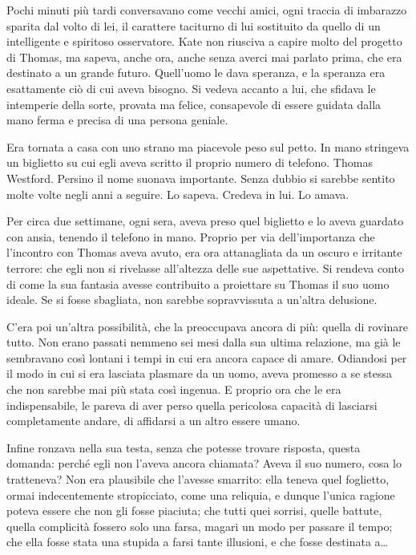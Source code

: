Pochi minuti più tardi conversavano come vecchi amici, ogni traccia di imbarazzo sparita dal volto
di lei, il carattere taciturno di lui sostituito da quello di un intelligente e spiritoso
osservatore. Kate non riusciva a capire molto del progetto di Thomas, ma sapeva, anche ora, anche
senza averci mai parlato prima, che era destinato a un grande futuro. Quell'uomo le dava speranza, e
la speranza era esattamente ciò di cui aveva bisogno. Si vedeva accanto a lui, che sfidava le
intemperie della sorte, provata ma felice, consapevole di essere guidata dalla mano ferma e precisa
di una persona geniale.

Era tornata a casa con uno strano ma piacevole peso sul petto. In mano stringeva un biglietto su cui
egli aveva scritto il proprio numero di telefono. Thomas Westford. Persino il nome suonava
importante. Senza dubbio si sarebbe sentito molte volte negli anni a seguire. Lo sapeva. Credeva in
lui. Lo amava.

Per circa due settimane, ogni sera, aveva preso quel biglietto e lo aveva guardato con ansia,
tenendo il telefono in mano. Proprio per via dell'importanza che l'incontro con Thomas aveva avuto,
era ora attanagliata da un oscuro e irritante terrore: che egli non si rivelasse all'altezza delle
sue aspettative. Si rendeva conto di come la sua fantasia avesse contribuito a proiettare su Thomas
il suo uomo ideale. Se si fosse sbagliata, non sarebbe sopravvissuta a un'altra delusione.

C'era poi un'altra possibilità, che la preoccupava ancora di più: quella di rovinare tutto. Non
erano passati nemmeno sei mesi dalla sua ultima relazione, ma già le sembravano così lontani i tempi
in cui era ancora capace di amare. Odiandosi per il modo in cui si era lasciata plasmare da un uomo,
aveva promesso a se stessa che non sarebbe mai più stata così ingenua. E proprio ora che le era
indispensabile, le pareva di aver perso quella pericolosa capacità di lasciarsi completamente
andare, di affidarsi a un altro essere umano.

Infine ronzava nella sua testa, senza che potesse trovare risposta, questa domanda: perché egli non
l'aveva ancora chiamata? Aveva il suo numero, cosa lo tratteneva? Non era plausibile che l'avesse
smarrito: ella teneva quel foglietto, ormai indecentemente stropicciato, come una reliquia, e dunque
l'unica ragione poteva essere che non gli fosse piaciuta; che tutti quei sorrisi, quelle battute,
quella complicità fossero solo una farsa, magari un modo per passare il tempo; che ella fosse stata
una stupida a farsi tante illusioni, e che fosse destinata a\dots

